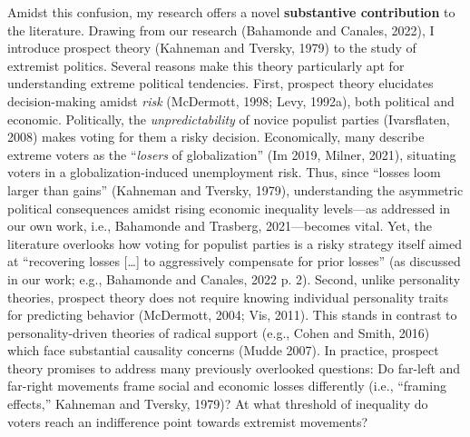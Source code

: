 \documentclass[letterpaper]{article}
\begin{document}
\vspace{2mm}Amidst this confusion, my research offers a novel {\bf substantive contribution} to the literature. Drawing from our research (Bahamonde and Canales, 2022), I introduce prospect theory (Kahneman and Tversky, 1979) to the study of extremist politics. Several reasons make this theory particularly apt for understanding extreme political tendencies. First, prospect theory elucidates decision-making amidst \emph{risk} (McDermott, 1998; Levy, 1992a), both political and economic. Politically, the \emph{unpredictability} of novice populist parties (Ivarsflaten, 2008) makes voting for them a risky decision. Economically, many describe extreme voters as the ``\emph{losers} of globalization'' (Im 2019, Milner, 2021), situating voters in a globalization-induced unemployment risk.  Thus, since ``losses loom larger than gains'' (Kahneman and Tversky, 1979), understanding the asymmetric political consequences amidst rising economic inequality levels---as addressed in our own work, i.e., Bahamonde and Trasberg, 2021---becomes vital. Yet, the literature overlooks how voting for populist parties is a risky strategy itself aimed at ``recovering losses […] to aggressively compensate for prior losses'' (as discussed in our work; e.g., Bahamonde and Canales, 2022 p. 2). Second, unlike personality theories, prospect theory does not require knowing individual personality traits for predicting behavior (McDermott, 2004; Vis, 2011). This stands in contrast to personality-driven theories of radical support (e.g., Cohen and Smith, 2016) which face substantial causality concerns (Mudde 2007). In practice, prospect theory promises to address many previously overlooked questions: Do far-left and far-right movements frame social and economic losses differently (i.e., ``framing effects,'' Kahneman and Tversky, 1979)? At what threshold of inequality do voters reach an indifference point towards extremist movements?
\end{document}
